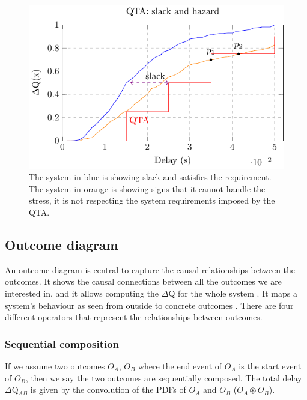         \begin{figure}[H]
            \begin{center}
                \includegraphics[scale=1]{tikz/cdf_qta_slack.pdf}
            \end{center}
            \label{fig:qta_step}
            \caption{The system in blue is showing slack and satisfies the requirement. The system in orange is showing signs that it cannot handle the stress, it is not respecting the system requirements imposed by the QTA.}%
        \end{figure}

    \subsection{Outcome diagram}
        An outcome diagram is central to capture the causal relationships between the outcomes. It shows the causal connections between all the outcomes we are interested in, and it allows computing the $\Delta$Q for the whole system \cite{dq-tut}. It maps a system's behaviour as seen from outside to concrete outcomes \cite{art}.
        There are four different operators that represent the relationships between outcomes. 

    \subsubsection{Sequential composition}
        If we assume two outcomes $O_A$, $O_B$ where the end event of $O_A$ is the start event of $O_B$, then we say the two outcomes are sequentially composed. The total delay $\Delta$Q$_{AB}$ is given by the convolution of the PDFs of $O_A$ and $O_B$ ($O_A \circledast O_B$).
        
